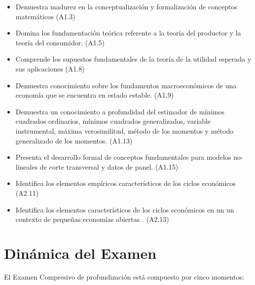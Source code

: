 \begin{itemize}

\item 	Demuestra madurez en la conceptualización y formalización de conceptos matemáticos (A1.3)
\item 	Domina los fundamentación teórica referente a la teoría del productor y la teoría del consumidor. (A1.5)
\item 	Comprende los supuestos fundamentales de la teoría de la utilidad esperada y sus aplicaciones (A1.8)
\item 	Demuestra conocimiento sobre los fundamentos macroeconómicos de una economía que se encuentra en estado estable. (A1.9)
\item 	Demuestra un conocimiento a profundidad del estimador de mínimos cuadrados ordinarios, mínimos cuadrados generalizados, variable instrumental, máxima verosimilitud, método de los momentos y método generalizado de los momentos. (A1.13)
\item 	Presenta el desarrollo formal de conceptos fundamentales para modelos no-lineales de corte transversal y datos de panel. (A1.15)
\item 	Identifica los elementos empíricos característicos de los ciclos económicos (A2.11)
\item 	Identifica los elementos característicos de los ciclos económicos en un un contexto de pequeñas economías abiertas . (A2.13)

\end{itemize}


\section{Dinámica del Examen}

El Examen Compresivo de profundización está compuesto por cinco momentos:


